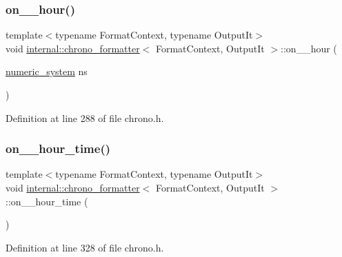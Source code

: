 \subsubsection{\texorpdfstring{on\+\_\+\_\+hour()}{on\_24\_hour()}}
{\footnotesize\ttfamily template$<$typename Format\+Context, typename Output\+It$>$ \\
void \hyperlink{structinternal_1_1chrono__formatter}{internal\+::chrono\+\_\+formatter}$<$ Format\+Context, Output\+It $>$\+::on\+\_\+\_\+hour (\begin{DoxyParamCaption}\item[{\hyperlink{namespaceinternal_a16e2a1195ca0f5beab658685f71df86b}{numeric\+\_\+system}}]{ns }\end{DoxyParamCaption})\hspace{0.3cm}{\ttfamily [inline]}}



Definition at line 288 of file chrono.\+h.

\mbox{\label{structinternal_1_1chrono__formatter_a5c9271dd72f0802191c6adfaeae8a1dc}} 
\subsubsection{\texorpdfstring{on\+\_\+\_\+hour\+\_\+time()}{on\_24\_hour\_time()}}
{\footnotesize\ttfamily template$<$typename Format\+Context, typename Output\+It$>$ \\
void \hyperlink{structinternal_1_1chrono__formatter}{internal\+::chrono\+\_\+formatter}$<$ Format\+Context, Output\+It $>$\+::on\+\_\+\_\+hour\+\_\+time (\begin{DoxyParamCaption}{ }\end{DoxyParamCaption})\hspace{0.3cm}{\ttfamily [inline]}}



Definition at line 328 of file chrono.\+h.

